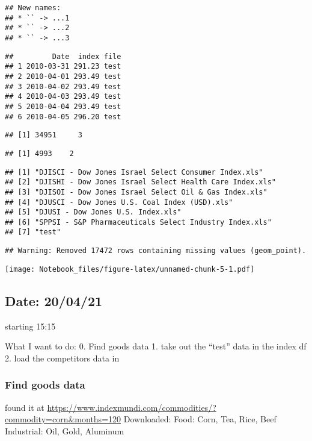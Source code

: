 \documentclass[
]{article}
\begin{document}
\begin{verbatim}
## New names:
## * `` -> ...1
## * `` -> ...2
## * `` -> ...3
\end{verbatim}

\begin{verbatim}
##         Date  index file
## 1 2010-03-31 291.23 test
## 2 2010-04-01 293.49 test
## 3 2010-04-02 293.49 test
## 4 2010-04-03 293.49 test
## 5 2010-04-04 293.49 test
## 6 2010-04-05 296.20 test
\end{verbatim}

\begin{verbatim}
## [1] 34951     3
\end{verbatim}

\begin{verbatim}
## [1] 4993    2
\end{verbatim}

\begin{verbatim}
## [1] "DJISCI - Dow Jones Israel Select Consumer Index.xls"   
## [2] "DJISHI - Dow Jones Israel Select Health Care Index.xls"
## [3] "DJISOI - Dow Jones Israel Select Oil & Gas Index.xls"  
## [4] "DJUSCI - Dow Jones U.S. Coal Index (USD).xls"          
## [5] "DJUSI - Dow Jones U.S. Index.xls"                      
## [6] "SPPSI - S&P Pharmaceuticals Select Industry Index.xls" 
## [7] "test"
\end{verbatim}

\begin{verbatim}
## Warning: Removed 17472 rows containing missing values (geom_point).
\end{verbatim}

\texttt{[image: Notebook\_files/figure-latex/unnamed-chunk-5-1.pdf]}

\hypertarget{date-200421}{%
\subsection{Date: 20/04/21}\label{date-200421}}

starting 15:15

What I want to do: 0. Find goods data 1. take out the ``test'' data in
the index df 2. load the competitors data in

\hypertarget{find-goods-data}{%
\subsubsection{Find goods data}\label{find-goods-data}}

found it at
\url{https://www.indexmundi.com/commodities/?commodity=corn\&months=120}
Downloaded: Food: Corn, Tea, Rice, Beef Industrial: Oil, Gold, Aluminum
\end{document}
